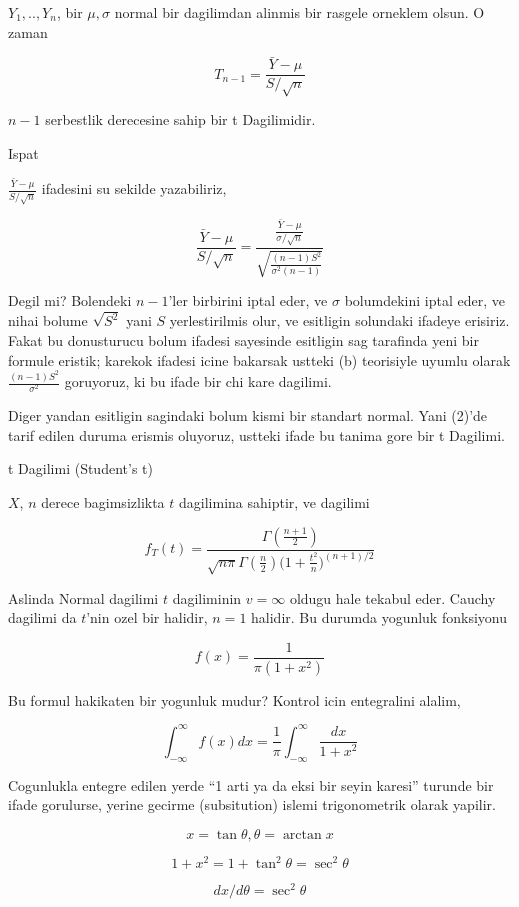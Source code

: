 \documentclass[12pt,fleqn]{article}\usepackage{../common}
\begin{document}
$Y_1,..,Y_n$, bir $\mu,\sigma$ normal bir dagilimdan alinmis bir rasgele
orneklem olsun. O zaman 

$$ T_{n-1} = \frac{\bar{Y}-\mu}{S/\sqrt{n}}$$

$n-1$ serbestlik derecesine sahip bir t Dagilimidir. 

Ispat

$\frac{\bar{Y}-\mu}{S/\sqrt{n}}$ ifadesini su sekilde yazabiliriz, 

$$ \frac{\bar{Y}-\mu}{S/\sqrt{n}} =
\frac{\frac{\bar{Y}-\mu}{\sigma/\sqrt{n}} }
{\sqrt{\frac{(n-1)S^2}{\sigma^2(n-1)}}}
$$

Degil mi? Bolendeki $n-1$'ler birbirini iptal eder, ve $\sigma$ bolumdekini
iptal eder, ve nihai bolume $\sqrt{S^2}$ yani $S$ yerlestirilmis olur, ve
esitligin solundaki ifadeye erisiriz. Fakat bu donusturucu bolum ifadesi
sayesinde esitligin sag tarafinda yeni bir formule eristik; karekok ifadesi
icine bakarsak ustteki (b) teorisiyle uyumlu olarak
$\frac{(n-1)S^2}{\sigma^2}$ goruyoruz, ki bu ifade bir chi kare dagilimi.

Diger yandan esitligin sagindaki bolum kismi bir standart normal. Yani
(2)'de tarif edilen duruma erismis oluyoruz, ustteki ifade bu tanima gore
bir t Dagilimi. 


t Dagilimi (Student's t) 

$X$, $n$ derece bagimsizlikta $t$ dagilimina sahiptir, ve dagilimi

$$ 
f_T(t) = 
\frac
{
\Gamma(\frac{n+1}{2})
}
{
\sqrt{n\pi}\Gamma(\frac{n}{2})
\bigg(1+\frac{t^2}{n}\bigg)^{(n+1)/2}
}
 $$

Aslinda Normal dagilimi $t$ dagiliminin $v = \infty$ oldugu hale tekabul
eder. Cauchy dagilimi da $t$'nin ozel bir halidir, $n = 1$ halidir. Bu
durumda yogunluk fonksiyonu

$$ f(x)  = \frac{ 1}{\pi(1+ x^2)} $$

Bu formul hakikaten bir yogunluk mudur? Kontrol icin entegralini alalim, 

$$ \int _{ -\infty}^{\infty} f(x) dx = 
\frac{ 1}{\pi} \int _{ -\infty}^{\infty} \frac{ dx}{1 + x^2} 
 $$

Cogunlukla entegre edilen yerde  ``1 arti ya da eksi bir seyin karesi''
turunde  bir ifade gorulurse, yerine gecirme (subsitution) islemi
trigonometrik  olarak  yapilir. 

$$  x = \tan \theta, \theta = \arctan x $$

$$ 1 + x^2 = 1 + \tan^2\theta = \sec^2\theta$$

$$ dx / d\theta = \sec^2\theta $$
\end{document}

